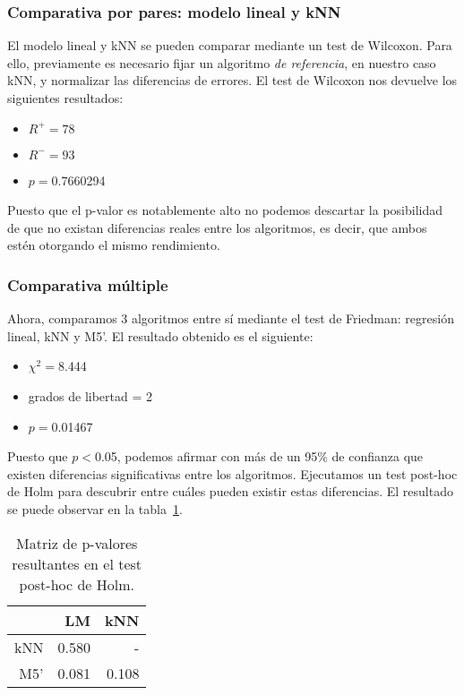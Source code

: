 \documentclass[a4paper, 11pt]{article}
\begin{document}
\subsubsection{Comparativa por pares: modelo lineal y kNN}

El modelo lineal y kNN se pueden comparar mediante un test de Wilcoxon. Para ello, previamente es necesario fijar un algoritmo \textit{de referencia}, en nuestro caso kNN, y normalizar las diferencias de errores. El test de Wilcoxon nos devuelve los siguientes resultados:
\begin{itemize}
\item $R^+=78$
\item $R^-=93$
\item $p=0$.7660294
\end{itemize}
Puesto que el p-valor es notablemente alto no podemos descartar la posibilidad de que no existan diferencias reales entre los algoritmos, es decir, que ambos estén otorgando el mismo rendimiento.

\subsubsection{Comparativa múltiple}

Ahora, comparamos 3 algoritmos entre sí mediante el test de Friedman: regresión lineal, kNN y M5'. El resultado obtenido es el siguiente:
\begin{itemize}
\item $\chi^2=8$.444
\item grados de libertad = 2
\item $p=0.$01467
\end{itemize}

Puesto que $p<0$.05,  podemos afirmar con más de un 95\% de confianza que existen diferencias significativas entre los algoritmos. Ejecutamos un test post-hoc de Holm para descubrir entre cuáles pueden existir estas diferencias. El resultado se puede observar en la tabla~\ref{tbl:holm}.

\begin{table}[ht]
  \caption{\label{tbl:holm}Matriz de p-valores resultantes en el test post-hoc de Holm.}
  
  \begin{tabular}{ r | r r }
    & LM & kNN \\
    \hline
    kNN & 0.580 & - \\
    M5' & 0.081 & 0.108 
  \end{tabular}
\end{table}
\end{document}
